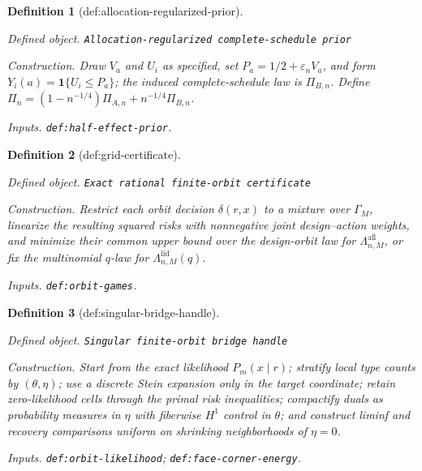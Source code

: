 \documentclass{article}
\newtheorem{definition}{Definition}
\begin{document}
\begin{definition}[def:allocation-regularized-prior]\label{def:allocation-regularized-prior}
\par\smallskip\noindent\emph{Defined object.} \texttt{Allocation-\allowbreak{}regularized complete-\allowbreak{}schedule prior}
\par\smallskip\noindent\emph{Construction.} Draw \(V_a\) and \(U_i\) as specified, set \(P_a=1/2+\varepsilon_nV_a\), and form \(Y_i(a)=\mathbf 1\{U_i\le P_a\}\); the induced complete-schedule law is \(\Pi_{B,n}\). Define \(\Pi_n=(1-n^{-1/4})\Pi_{A,n}+n^{-1/4}\Pi_{B,n}\).
\par\smallskip\noindent\emph{Inputs.} \texttt{def:\allowbreak{}half-\allowbreak{}effect-\allowbreak{}prior}.
\end{definition}

\begin{definition}[def:grid-certificate]\label{def:grid-certificate}
\par\smallskip\noindent\emph{Defined object.} \texttt{Exact rational finite-\allowbreak{}orbit certificate}
\par\smallskip\noindent\emph{Construction.} Restrict each orbit decision \(\delta(r,x)\) to a mixture over \(\Gamma_M\), linearize the resulting squared risks with nonnegative joint design--action weights, and minimize their common upper bound over the design-orbit law for \(\Lambda_{n,M}^{\mathrm{all}}\), or fix the multinomial \(q\)-law for \(\Lambda_{n,M}^{\mathrm{iid}}(q)\).
\par\smallskip\noindent\emph{Inputs.} \texttt{def:\allowbreak{}orbit-\allowbreak{}games}.
\end{definition}

\begin{definition}[def:singular-bridge-handle]\label{def:singular-bridge-handle}
\par\smallskip\noindent\emph{Defined object.} \texttt{Singular finite-\allowbreak{}orbit bridge handle}
\par\smallskip\noindent\emph{Construction.} Start from the exact likelihood \(P_m(x\mid r)\); stratify local type counts by \((\theta,\eta)\); use a discrete Stein expansion only in the target coordinate; retain zero-likelihood cells through the primal risk inequalities; compactify duals as probability measures in \(\eta\) with fiberwise \(H^1\) control in \(\theta\); and construct liminf and recovery comparisons uniform on shrinking neighborhoods of \(\eta=0\).
\par\smallskip\noindent\emph{Inputs.} \texttt{def:\allowbreak{}orbit-\allowbreak{}likelihood}; \texttt{def:\allowbreak{}face-\allowbreak{}corner-\allowbreak{}energy}.
\end{definition}
\end{document}
